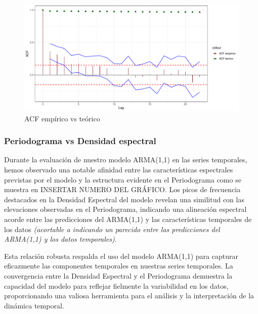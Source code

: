 \documentclass[
  letterpaper,
  DIV=11,
  numbers=noendperiod,
  twocolumn]{scrartcl}
\begin{document}
\begin{figure}[H]

{\centering \includegraphics{pdf_tarea2_files/figure-pdf/fig-exp9-1.pdf}

}

\caption{\label{fig-exp9}ACF empírico vs teórico}

\end{figure}

\hypertarget{periodograma-vs-densidad-espectral}{%
\subsubsection{Periodograma vs Densidad
espectral}\label{periodograma-vs-densidad-espectral}}

Durante la evaluación de nuestro modelo ARMA(1,1) en las series
temporales, hemos observado una notable afinidad entre las
características espectrales previstas por el modelo y la estructura
evidente en el Periodograma como se muestra en INSERTAR NUMERO DEL
GRÁFICO. Los picos de frecuencia destacados en la Densidad Espectral del
modelo revelan una similitud con las elevaciones observadas en el
Periodograma, indicando una alineación espectral acorde entre las
predicciones del ARMA(1,1) y las características temporales de los datos
\emph{(acortable a indicando un parecido entre las predicciones del
ARMA(1,1) y los datos temporales)}.

Esta relación robusta respalda el uso del modelo ARMA(1,1) para capturar
eficazmente las componentes temporales en nuestras series temporales. La
convergencia entre la Densidad Espectral y el Periodograma demuestra la
capacidad del modelo para reflejar fielmente la variabilidad en los
datos, proporcionando una valiosa herramienta para el análisis y la
interpretación de la dinámica temporal.
\end{document}
